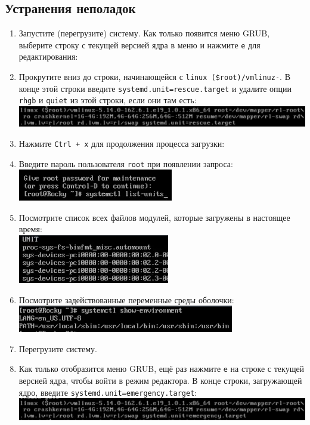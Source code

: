 \documentclass[12pt]{article}
\begin{document}
\subsection{Устранения неполадок}
\begin{enumerate}
	\item Запустите (перегрузите) систему. Как только появится меню GRUB, выберите строку с текущей версией ядра в меню и нажмите \texttt{e} для редактирования:
	\item Прокрутите вниз до строки, начинающейся с \texttt{linux (\$root)/vmlinuz-}.
	      В конце этой строки введите \texttt{systemd.unit=rescue.target} и удалите опции \texttt{rhgb} и \texttt{quiet} из этой строки, если они там есть:
	      \\\includegraphics{3.png}
	\item Нажмите \texttt{Ctrl + x} для продолжения процесса загрузки:
	\item Введите пароль пользователя \texttt{root} при появлении запроса:
	      \\\includegraphics{4.png}
	\item Посмотрите список всех файлов модулей, которые загружены в настоящее время:
	      \\\includegraphics{5.png}
	\item Посмотрите задействованные переменные среды оболочки:
	      \\\includegraphics{6.png}
	\item Перегрузите систему.
	\item Как только отобразится меню GRUB, ещё раз нажмите \texttt{e} на строке с текущей версией ядра, чтобы войти в режим редактора. В конце строки, загружающей ядро, введите \texttt{systemd.unit=emergency.target}:
	      \\\includegraphics{7.png}

\end{enumerate}
\end{document}
